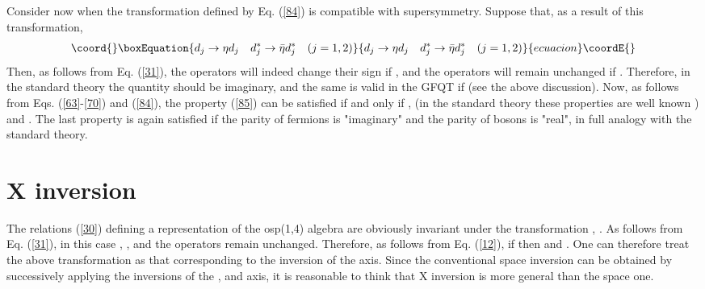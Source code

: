 \documentclass[a4paper,12pt]{article}%
\begin{document}
Consider now when the transformation defined by Eq. (\ref{84})
is compatible with supersymmetry. Suppose that, as a result
of this transformation, 
\begin{equation}\coord{}\boxEquation{
d_j\rightarrow \eta d_j\quad 
d_j^*\rightarrow {\bar\eta} d_j^* \quad(j=1,2)
\label{85}
}{
d_j\rightarrow \eta d_j\quad 
d_j^*\rightarrow {\bar\eta} d_j^* \quad(j=1,2)
}{ecuacion}\coordE{}\end{equation}
Then, as follows from Eq. (\ref{31}), the operators
\coordHE{} will indeed change their sign 
if \coordHE{}, and the operators \coordHE{} will remain
unchanged if \coordHE{}. Therefore, in the standard
theory the quantity \myHighlight{$\eta$}\coordHE{} should be imaginary, and the same
is valid in the GFQT if \coordHE{} (see the above
discussion). Now, as follows from Eqs. (\ref{63}-\ref{70}) 
and (\ref{84}), the property (\ref{85}) can be satisfied
if and only if \coordHE{}, \coordHE{} 
(in the standard theory these properties are well known
 \cite{Wein-super}) and 
\coordHE{}. The last 
property is again satisfied if the parity of fermions is
"imaginary" and the parity of bosons is "real", in full
analogy with the standard theory.

\section{X inversion}
\label{S9}

The relations (\ref{30}) defining a representation of the
osp(1,4) algebra are obviously invariant under the
transformation \coordHE{},
\coordHE{}. 
As follows from Eq. (\ref{31}), in this
case \coordHE{}, 
\coordHE{}, \coordHE{}
and the operators \coordHE{} remain unchanged.
Therefore, as follows from Eq. (\ref{12}), if 
\coordHE{} then \coordHE{} and
\coordHE{}. One can therefore 
treat the above transformation as that corresponding
to the inversion of the \coordHE{} axis. Since the
conventional space inversion can be obtained by
successively applying the inversions of the \coordHE{},
\coordHE{} and \coordHE{} axis, it is reasonable to think that
X inversion is more general than the space one. 
\end{document}
